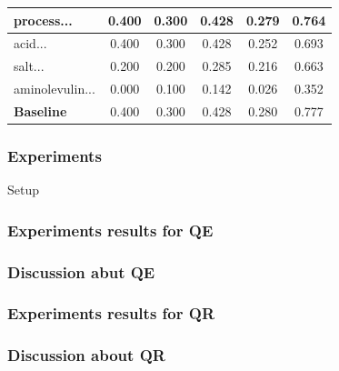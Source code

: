 \documentclass[xcolor=dvipsnames]{beamer}
\begin{document}
\begin{frame}
\begin{tiny}
\begin{table}[h]
\begin{tabular}{|l|c|c|c|c|c|}
\hline 
{\scriptsize{}process...} & {\scriptsize{}0.400} & {\scriptsize{}0.300} & {\scriptsize{}0.428} & {\scriptsize{}0.279} & {\scriptsize{}0.764}\tabularnewline
\hline 
{\scriptsize{}acid...} & {\scriptsize{}0.400} & {\scriptsize{}0.300} & {\scriptsize{}0.428} & {\scriptsize{}0.252} & {\scriptsize{}0.693}\tabularnewline
\hline 
{\scriptsize{}salt...} & {\scriptsize{}0.200} & {\scriptsize{}0.200} & {\scriptsize{}0.285} & {\scriptsize{}0.216} & {\scriptsize{}0.663}\tabularnewline
\hline 
{\scriptsize{}aminolevulin...} & {\scriptsize{}0.000} & {\scriptsize{}0.100} & {\scriptsize{}0.142} & {\scriptsize{}0.026} & {\scriptsize{}0.352}\tabularnewline
\hline 
\hline 
\textbf{\scriptsize{}Baseline} & {\scriptsize{}0.400} & {\scriptsize{}0.300} & {\scriptsize{}0.428} & {\scriptsize{}0.280} & {\scriptsize{}0.777}\tabularnewline
\hline 
\end{tabular}
\end{table}
\end{tiny}


\end{frame}



\begin{frame}
\frametitle{Experiments}

Setup


\end{frame}



\begin{frame}
\frametitle{Experiments results for QE}
\end{frame}



\begin{frame}
\frametitle{Discussion abut QE}
\end{frame}



\begin{frame}
\frametitle{Experiments results for QR}
\end{frame}



\begin{frame}
\frametitle{Discussion about QR}
\end{frame}



\begin{frame}
\frametitle{}
\end{frame}



\begin{frame}
\frametitle{}
\end{frame}
\end{document}
